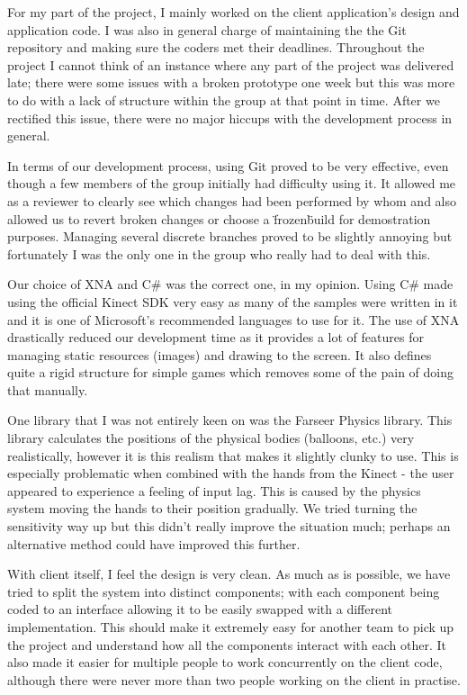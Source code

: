 For my part of the project, I mainly worked on the client application's design
and application code. I was also in general charge of maintaining the the Git
repository and making sure the coders met their deadlines. Throughout the
project I cannot think of an instance where any part of the project was
delivered late; there were some issues with a broken prototype one week but
this was more to do with a lack of structure within the group at that point in
time. After we rectified this issue, there were no major hiccups with the
development process in general.

In terms of our development process, using Git proved to be very effective, even
though a few members of the group initially had difficulty using it. It allowed
me as a reviewer to clearly see which changes had been performed by whom and
also allowed us to revert broken changes or choose a \"frozen\" build for 
demostration purposes. Managing several discrete branches proved to be slightly
annoying but fortunately I was the only one in the group who really had to deal
with this.

Our choice of XNA and C\# was the correct one, in my opinion. Using C\# made
using the official Kinect SDK very easy as many of the samples were written in
it and it is one of Microsoft's recommended languages to use for it. The use of
XNA drastically reduced our development time as it provides a lot of features
for managing static resources (images) and drawing to the screen. It also
defines quite a rigid structure for simple games which removes some of the pain
of doing that manually.

One library that I was not entirely keen on was the Farseer Physics library. This
library calculates the positions of the physical bodies (balloons, etc.) very
realistically, however it is this realism that makes it slightly clunky to use.
This is especially problematic when combined with the hands from the Kinect -
the user appeared to experience a feeling of input lag. This is caused by the
physics system moving the hands to their position gradually. We tried turning
the sensitivity way up but this didn't really improve the situation much; 
perhaps an alternative method could have improved this further.

With client itself, I feel the design is very clean. As much as is possible, we
have tried to split the system into distinct components; with each component
being coded to an interface allowing it to be easily swapped with a different
implementation. This should make it extremely easy for another team to pick up
the project and understand how all the components interact with each other. It
also made it easier for multiple people to work concurrently on the client code,
although there were never more than two people working on the client in 
practise.

